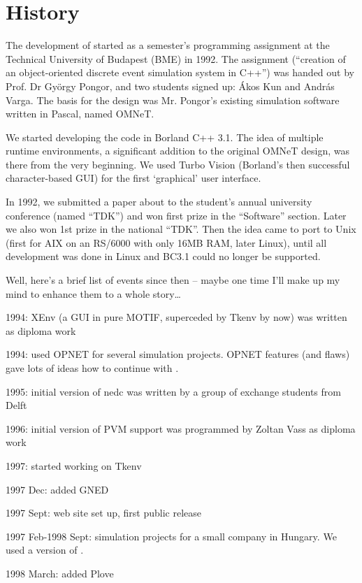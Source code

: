 \section{History}

The development of {\opp} started as a semester's programming
assignment at the Technical University of Budapest (BME) in 1992.
The assignment (``creation of an object-oriented discrete event
simulation system in C++'') was handed out by Prof. Dr Gy\"{o}rgy
Pongor, and two students signed up: \'{A}kos Kun and Andr\'{a}s Varga.
The basis for the design was Mr. Pongor's existing simulation
software written in Pascal, named OMNeT.

We started developing the code in Borland C++ 3.1. The idea
of multiple runtime environments, a significant addition to the
original OMNeT design, was there from the very beginning.
We used Turbo Vision (Borland's then successful character-based
GUI) for the first `graphical' user interface.

In 1992, we submitted a paper about {\opp} to the
student's annual university conference
(named ``TDK'') and won first prize in the ``Software'' section.
Later we also won 1st prize in the national ``TDK''. Then the
idea came to port {\opp} to Unix (first for AIX on an RS/6000
with only 16MB RAM, later Linux), until all development was done
in Linux and BC3.1 could no longer be supported.

Well, here's a brief list of events since then -- maybe one time
I'll make up my mind to enhance them to a whole story\dots

1994: XEnv (a GUI in pure MOTIF, superceded by Tkenv by now)
was written as diploma work

1994: used OPNET for several simulation projects. OPNET features
(and flaws) gave lots of ideas how to continue with {\opp}.

1995: initial version of nedc was written by a group of exchange
students from Delft

1996: initial version of PVM support was programmed by Zoltan
Vass as diploma work

1997: started working on Tkenv

1997 Dec: added GNED

1997 Sept: web site set up, first public release

1997 Feb-1998 Sept: simulation projects for a small company in
Hungary. We used a version of {\opp}.

1998 March: added Plove

